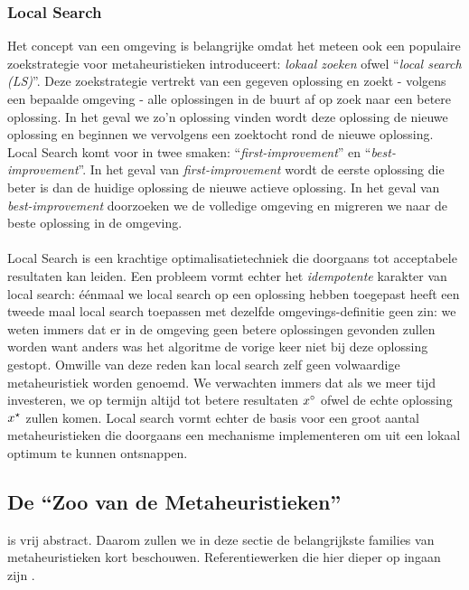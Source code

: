 \subsubsection{Local Search}
Het concept van een omgeving is belangrijke omdat het meteen ook een populaire zoek\-strategie voor metaheuristieken introduceert: \emph{lokaal zoeken} ofwel ``\emph{local search (LS)}''. Deze zoekstrategie vertrekt van een gegeven oplossing en zoekt - volgens een bepaalde omgeving - alle oplossingen in de buurt af op zoek naar een betere oplossing. In het geval we zo'n oplossing vinden wordt deze oplossing de nieuwe oplossing en beginnen we vervolgens een zoektocht rond de nieuwe oplossing. Local Search komt voor in twee smaken: ``\emph{first-improvement}'' en ``\emph{best-improvement}''. In het geval van \emph{first-improvement} wordt de eerste oplossing die beter is dan de huidige oplossing de nieuwe actieve oplossing. In het geval van \emph{best-improvement} doorzoeken we de volledige omgeving en migreren we naar de beste oplossing in de omgeving.
\paragraph{}
Local Search is een krachtige optimalisatietechniek die doorgaans tot acceptabele resultaten kan leiden. Een probleem vormt echter het \emph{idempotente} karakter van local search: \'e\'enmaal we local search op een oplossing hebben toegepast heeft een tweede maal local search toepassen met dezelfde omgevings-definitie geen zin: we weten immers dat er in de omgeving geen betere oplossingen gevonden zullen worden want anders was het algoritme de vorige keer niet bij deze oplossing gestopt. Omwille van deze reden kan local search zelf geen volwaardige metaheuristiek worden genoemd\cite{lsAndMh}. We verwachten immers dat als we meer tijd investeren, we op termijn altijd tot betere resultaten $x^{\circ}$ ofwel de echte oplossing $x^{\star}$ zullen komen. Local search vormt echter de basis voor een groot aantal metaheuristieken die doorgaans een mechanisme implementeren om uit een lokaal optimum te kunnen ontsnappen.

\subsection{De ``Zoo van de Metaheuristieken''}

 is vrij abstract. Daarom zullen we in deze sectie de belangrijkste families van metaheuristieken kort beschouwen. Referentiewerken die hier dieper op ingaan zijn \cite{Glover2003,gendreau2010handbook,blum2003metaheuristics,osman:1996}.

